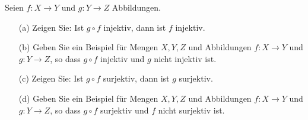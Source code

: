 Seien \( f : X \rightarrow Y \) und \( g : Y \rightarrow Z \) Abbildungen.

\begin{enumerate}
    \item[(a)] Zeigen Sie: Ist \( g \circ f \) injektiv, dann ist \( f \) injektiv.
    \item[(b)] Geben Sie ein Beispiel für Mengen \( X, Y, Z \) und Abbildungen \( f : X \rightarrow Y \) und \( g : Y \rightarrow Z \), so dass \( g \circ f \) injektiv und \( g \) nicht injektiv ist.
    \item[(c)] Zeigen Sie: Ist \( g \circ f \) surjektiv, dann ist \( g \) surjektiv.
    \item[(d)] Geben Sie ein Beispiel für Mengen \( X, Y, Z \) und Abbildungen \( f : X \rightarrow Y \) und \( g : Y \rightarrow Z \), so dass \( g \circ f \) surjektiv und \( f \) nicht surjektiv ist.
\end{enumerate}